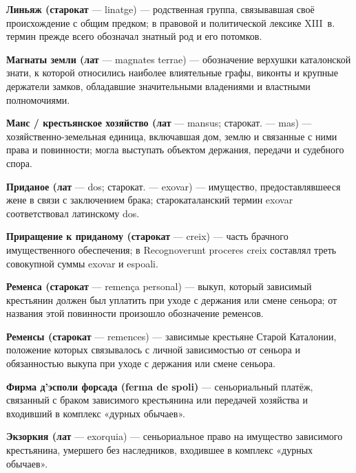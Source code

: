 \noindent\textbf{Линьяж (старокат} --- linatge) --- родственная группа, связывавшая своё происхождение с общим предком; в правовой и политической лексике XIII~в. термин прежде всего обозначал знатный род и его потомков.
\par\medskip

\noindent\textbf{Магнаты земли (лат} --- magnates terrae) --- обозначение верхушки каталонской знати, к которой относились наиболее влиятельные графы, виконты и крупные держатели замков, обладавшие значительными владениями и властными полномочиями.
\par\medskip

\noindent\textbf{Манс / крестьянское хозяйство (лат} --- mansus; старокат. --- mas) --- хозяйственно-земельная единица, включавшая дом, землю и связанные с ними права и повинности; могла выступать объектом держания, передачи и судебного спора.
\par\medskip

\noindent\textbf{Приданое (лат} --- dos; старокат. --- exovar) --- имущество, предоставлявшееся жене в связи с заключением брака; старокаталанский термин exovar соответствовал латинскому dos.
\par\medskip

\noindent\textbf{Приращение к приданому (старокат} --- creix) --- часть брачного имущественного обеспечения; в Recognoverunt proceres creix составлял треть совокупной суммы exovar и espoali.
\par\medskip

\noindent\textbf{Ременса (старокат} --- remença personal) --- выкуп, который зависимый крестьянин должен был уплатить при уходе с держания или смене сеньора; от названия этой повинности произошло обозначение ременсов.
\par\medskip

\noindent\textbf{Ременсы (старокат} --- remences) --- зависимые крестьяне Старой Каталонии, положение которых связывалось с личной зависимостью от сеньора и обязанностью выкупа при уходе с держания или смене сеньора.
\par\medskip

\noindent\textbf{Фирма д’эсполи форсада (ferma de spoli)} --- сеньориальный платёж, связанный с браком зависимого крестьянина или передачей хозяйства и входивший в комплекс «дурных обычаев».
\par\medskip

\noindent\textbf{Экзоркия (лат} --- exorquia) --- сеньориальное право на имущество зависимого крестьянина, умершего без наследников, входившее в комплекс «дурных обычаев».
\par\medskip

